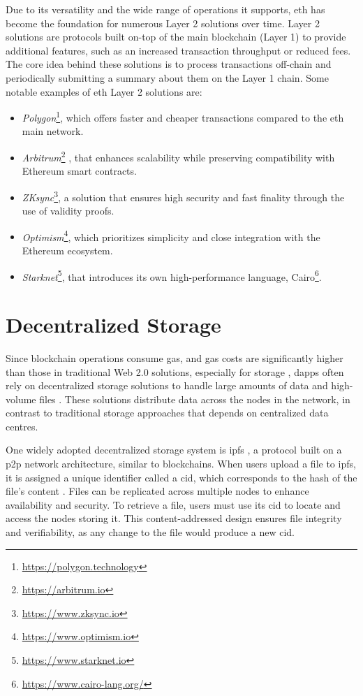 Due to its versatility and the wide range of operations it supports, \acrlong{eth} has become the foundation for numerous Layer 2 solutions \cite{sguanci2021layer2blockchainscaling} over time. Layer 2 solutions are protocols built on-top of the main blockchain (Layer 1) to provide additional features, such as an increased transaction throughput or reduced fees. The core idea behind these solutions is to process transactions off-chain and periodically submitting a summary about them on the Layer 1 chain. Some notable examples of \acrshort{eth} Layer 2 solutions are:

\begin{itemize}
    \item \textit{Polygon}\footnote{\url{https://polygon.technology}}, which offers faster and cheaper transactions compared to the \acrlong{eth} main network.
    \item \textit{Arbitrum}\footnote{\url{https://arbitrum.io}} \cite{kalodner2018arbitrum}, that enhances scalability while preserving compatibility with Ethereum smart contracts.
    \item \textit{ZKsync}\footnote{\url{https://www.zksync.io}}, a solution that ensures high security and fast finality through the use of validity proofs.
    \item \textit{Optimism}\footnote{\url{https://www.optimism.io}}, which prioritizes simplicity and close integration with the Ethereum ecosystem.
    \item \textit{Starknet}\footnote{\url{https://www.starknet.io}}, that introduces its own high-performance language, Cairo\footnote{\url{https://www.cairo-lang.org/}}.
\end{itemize}

\section{Decentralized Storage}
Since blockchain operations consume gas, and gas costs are significantly higher than those in traditional Web 2.0 solutions, especially for storage \cite{surya2024designdecentralizedidentity}, \acrshort{dapp}s often rely on decentralized storage solutions to handle large amounts of data and high-volume files \cite{ray2023web3}\cite{muhle2018survey}. These solutions distribute data across the nodes in the network, in contrast to traditional storage approaches that depends on centralized data centres.

One widely adopted decentralized storage system is \acrfull{ipfs} \cite{benet2014ipfscontentaddressed}, a protocol built on a \gls{p2p} network architecture, similar to blockchains. When users upload a file to \acrshort{ipfs}, it is assigned a unique identifier called a \acrfull{cid}, which corresponds to the \gls{hash} of the file's content \cite{erikflorian2022ipfsandfrineds}. Files can be replicated across multiple nodes to enhance availability and security.  To retrieve a file, users must use its \acrshort{cid} to locate and access the nodes storing it. This content-addressed design ensures file integrity and verifiability, as any change to the file would produce a new \acrshort{cid}.